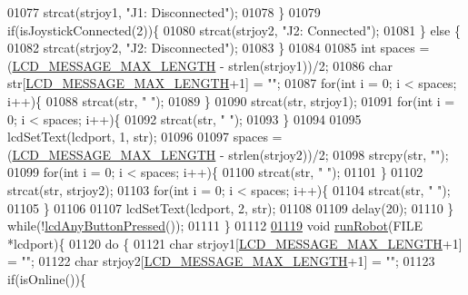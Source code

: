 \begin{DoxyCode}
{{{{{{{{{{{{{{01077             strcat(strjoy1, \textcolor{stringliteral}{"J1: Disconnected"});
01078         \}
01079         \textcolor{keywordflow}{if}(isJoystickConnected(2))\{
01080             strcat(strjoy2, \textcolor{stringliteral}{"J2: Connected"});
01081         \} \textcolor{keywordflow}{else} \{
01082             strcat(strjoy2, \textcolor{stringliteral}{"J2: Disconnected"});
01083         \}
01084 
01085         \textcolor{keywordtype}{int} spaces = (\hyperlink{lcdmsg_8h_abe4c4b70fc6f44ae3680e5b2c68cdd00}{LCD\_MESSAGE\_MAX\_LENGTH} - strlen(strjoy1))/2;
01086         \textcolor{keywordtype}{char} str[\hyperlink{lcdmsg_8h_abe4c4b70fc6f44ae3680e5b2c68cdd00}{LCD\_MESSAGE\_MAX\_LENGTH}+1] = \textcolor{stringliteral}{""};
01087         \textcolor{keywordflow}{for}(\textcolor{keywordtype}{int} i = 0; i < spaces; i++)\{
01088             strcat(str, \textcolor{stringliteral}{" "});
01089         \}
01090         strcat(str, strjoy1);
01091         \textcolor{keywordflow}{for}(\textcolor{keywordtype}{int} i = 0; i < spaces; i++)\{
01092             strcat(str, \textcolor{stringliteral}{" "});
01093         \}
01094 
01095         lcdSetText(lcdport, 1, str);
01096 
01097         spaces = (\hyperlink{lcdmsg_8h_abe4c4b70fc6f44ae3680e5b2c68cdd00}{LCD\_MESSAGE\_MAX\_LENGTH} - strlen(strjoy2))/2;
01098         strcpy(str, \textcolor{stringliteral}{""});
01099         \textcolor{keywordflow}{for}(\textcolor{keywordtype}{int} i = 0; i < spaces; i++)\{
01100             strcat(str, \textcolor{stringliteral}{" "});
01101         \}
01102         strcat(str, strjoy2);
01103         \textcolor{keywordflow}{for}(\textcolor{keywordtype}{int} i = 0; i < spaces; i++)\{
01104             strcat(str, \textcolor{stringliteral}{" "});
01105         \}
01106 
01107         lcdSetText(lcdport, 2, str);
01108 
01109         delay(20);
01110     \} \textcolor{keywordflow}{while}(!\hyperlink{lcddiag_8h_a0592813f995bfeeadb9bee923833ed35}{lcdAnyButtonPressed}());
01111 \}
01112 
\hypertarget{lcddiag_8c_source.tex_l01119}{}\hyperlink{lcddiag_8c_a7154650020a551de49d976659df81a9d}{01119} \textcolor{keywordtype}{void} \hyperlink{lcddiag_8c_a7154650020a551de49d976659df81a9d}{runRobot}(FILE *lcdport)\{
01120     \textcolor{keywordflow}{do} \{
01121         \textcolor{keywordtype}{char} strjoy1[\hyperlink{lcdmsg_8h_abe4c4b70fc6f44ae3680e5b2c68cdd00}{LCD\_MESSAGE\_MAX\_LENGTH}+1] = \textcolor{stringliteral}{""};
01122         \textcolor{keywordtype}{char} strjoy2[\hyperlink{lcdmsg_8h_abe4c4b70fc6f44ae3680e5b2c68cdd00}{LCD\_MESSAGE\_MAX\_LENGTH}+1] = \textcolor{stringliteral}{""};
01123         \textcolor{keywordflow}{if}(isOnline())\{
}}}}}}}}}}}}}}
\end{DoxyCode}
